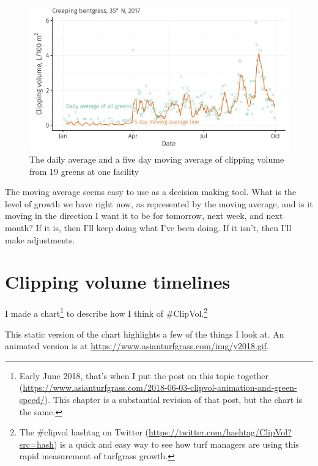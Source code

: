 \documentclass[12pt,b5,]{tufte-book}
\begin{document}
\begin{figure}
\centering
\includegraphics{img/b8-2.png}
\caption{The daily average and a five day moving average of clipping volume from 19 greens at one facility}
\end{figure}

The moving average seems easy to use as a decision making tool. What is the level of growth we have right now, as represented by the moving average, and is it moving in the direction I want it to be for tomorrow, next week, and next month? If it is, then I'll keep doing what I've been doing. If it isn't, then I'll make adjustments.

\hypertarget{animation1}{%
\chapter{Clipping volume timelines}\label{animation1}}

I made a chart\footnote{Early June 2018, that's when I put the post on this topic together (\url{https://www.asianturfgrass.com/2018-06-03-clipvol-animation-and-green-speed/}). This chapter is a substantial revision of that post, but the chart is the same.} to describe how I think of \#ClipVol.\footnote{The \#clipvol hashtag on Twitter (\url{https://twitter.com/hashtag/ClipVol?src=hash}) is a quick and easy way to see how turf managers are using this rapid measurement of turfgrass growth.}

This static version of the chart highlights a few of the things I look at. An animated version is at \url{https://www.asianturfgrass.com/img/y2018.gif}.
\end{document}
